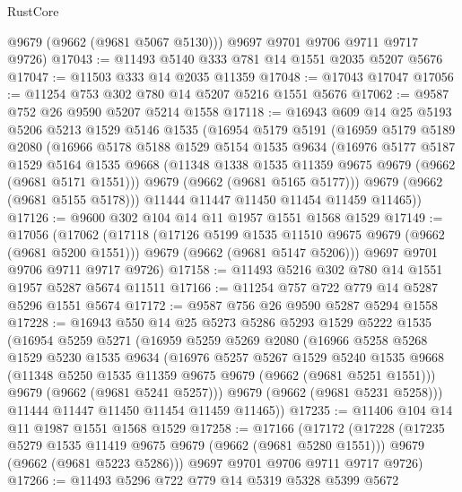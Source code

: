 \begin{lexlean}{RustCore}
\begin{coremodule}
        @9679
        (@9662 (@9681 @5067 @5130)))
      @9697
      @9701
      @9706
      @9711
      @9717
      @9726)
@17043 := @11493 @5140 @333 @781 @14 @1551 @2035 @5207 @5676
@17047 := @11503 @333 @14 @2035 @11359
@17048 := @17043 @17047
@17056 := @11254 @753 @302 @780 @14 @5207 @5216 @1551 @5676
@17062 := @9587 @752 @26 @9590 @5207 @5214 @1558
@17118 := @16943
    @609
    @14
    @25
    @5193
    @5206
    @5213
    @1529
    @5146
    @1535
    (@16954
      @5179
      @5191
      (@16959
        @5179
        @5189
        @2080
        (@16966
          @5178
          @5188
          @1529
          @5154
          @1535
          @9634
          (@16976
            @5177
            @5187
            @1529
            @5164
            @1535
            @9668
            (@11348 @1338 @1535 @11359 @9675 @9679 (@9662 (@9681 @5171 @1551)))
            @9679
            (@9662 (@9681 @5165 @5177)))
          @9679
          (@9662 (@9681 @5155 @5178)))
        @11444
        @11447
        @11450
        @11454
        @11459
        @11465))
@17126 := @9600 @302 @104 @14 @11 @1957 @1551 @1568 @1529
@17149 := @17056
    (@17062
      (@17118
        (@17126 @5199 @1535 @11510 @9675 @9679 (@9662 (@9681 @5200 @1551)))
        @9679
        (@9662 (@9681 @5147 @5206)))
      @9697
      @9701
      @9706
      @9711
      @9717
      @9726)
@17158 := @11493 @5216 @302 @780 @14 @1551 @1957 @5287 @5674 @11511
@17166 := @11254 @757 @722 @779 @14 @5287 @5296 @1551 @5674
@17172 := @9587 @756 @26 @9590 @5287 @5294 @1558
@17228 := @16943
    @550
    @14
    @25
    @5273
    @5286
    @5293
    @1529
    @5222
    @1535
    (@16954
      @5259
      @5271
      (@16959
        @5259
        @5269
        @2080
        (@16966
          @5258
          @5268
          @1529
          @5230
          @1535
          @9634
          (@16976
            @5257
            @5267
            @1529
            @5240
            @1535
            @9668
            (@11348 @5250 @1535 @11359 @9675 @9679 (@9662 (@9681 @5251 @1551)))
            @9679
            (@9662 (@9681 @5241 @5257)))
          @9679
          (@9662 (@9681 @5231 @5258)))
        @11444
        @11447
        @11450
        @11454
        @11459
        @11465))
@17235 := @11406 @104 @14 @11 @1987 @1551 @1568 @1529
@17258 := @17166
    (@17172
      (@17228
        (@17235 @5279 @1535 @11419 @9675 @9679 (@9662 (@9681 @5280 @1551)))
        @9679
        (@9662 (@9681 @5223 @5286)))
      @9697
      @9701
      @9706
      @9711
      @9717
      @9726)
@17266 := @11493 @5296 @722 @779 @14 @5319 @5328 @5399 @5672

\end{coremodule}
\end{lexlean}
